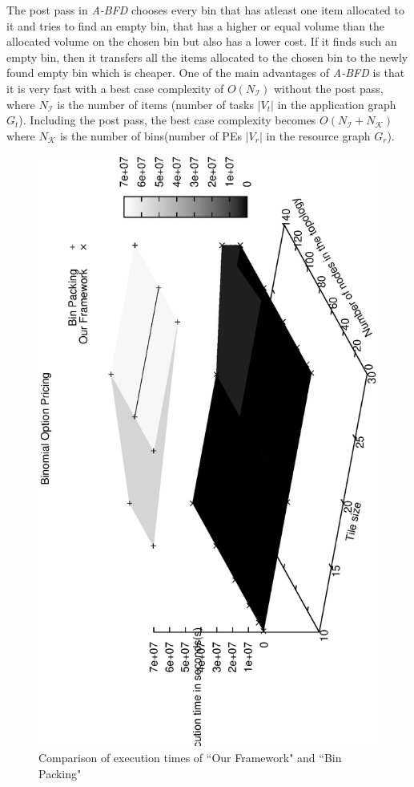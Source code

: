 The post pass in \textit{A-BFD} chooses every bin that has atleast one
item allocated to it and tries to find an empty bin, that has a higher
or equal volume than the allocated volume on the chosen bin but also has
a lower cost. If it finds such an empty bin, then it transfers all the
items allocated to the chosen bin to the newly found empty bin which is
cheaper. One of the main advantages of \textit{A-BFD} is that it is very
fast with a best case complexity of $O(N_\mathcal{I})$ without the post
pass, where $N_\mathcal{I}$ is the number of items (number of tasks
$|V_t|$ in the application graph $G_t$). Including the post pass, the
best case complexity becomes $O(N_\mathcal{I} + N_\mathcal{K})$ where
$N_\mathcal{K}$ is the number of bins(number of PEs $|V_r|$ in the
resource graph $G_r$).


\begin{figure}[t!]
  \centering
  \includegraphics[angle=-90, scale=0.33]{./figures/binomial3d.eps}
  \caption{Comparison of execution times of ``Our Framework" and ``Bin Packing"}
  \label{fig:binomial3d}
\end{figure}
